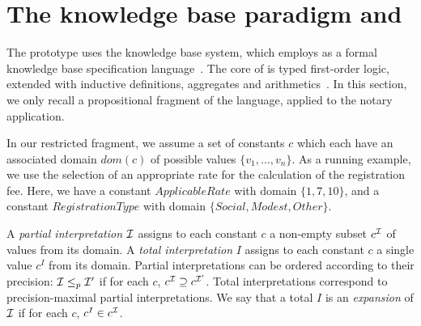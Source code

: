 
\section{The knowledge base paradigm and \idp}
\label{KBP}



The prototype uses the \idp knowledge base system, which employs \fodot as a formal knowledge base specification language~. The core of \fodot is typed first-order logic, extended with inductive definitions, aggregates and arithmetics~. 
In this section, we only recall a propositional fragment of the language, applied to the notary application.

In our restricted fragment, we assume a set of constants $c$ which each have an associated domain $dom(c)$ of possible values $\{v_1,\ldots,v_n\}$. As a running example, we use the selection of an appropriate rate for the calculation of the registration fee. Here, we have a constant $ApplicableRate$ with domain $\{1,7,10\}$, and a constant $RegistrationType$ with domain $\{Social, Modest, Other\}$. 

A \emph{partial interpretation} $\mathcal{I}$ assigns to each constant $c$ a non-empty subset $c^{\mathcal{I}}$ of values from its domain. A \emph{total interpretation} $I$ assigns to each constant $c$ a single value $c^I$ from its domain. Partial interpretations can be ordered according to their precision: $\mathcal{I} \leq_p \mathcal{I}'$ if for each $c$, $c^{\mathcal{I}} \supseteq c^{\mathcal{I}'}$. Total interpretations correspond to precision-maximal partial interpretations.
We say that a total $I$ is an \emph{expansion} of $\mathcal{I}$ if for each $c$, $c^I \in c^{\mathcal{I}}$.
\begin{comment}

As an example, the total interpretation
\[
I_{ex} = \{ ApplicableRate=1, RegistrationType=Social\}
\]
is an expansion of the partial
\begin{align*}
\ci_{ex} = \{ & ApplicableRate\in\{1,7\}, \\
& RegistrationType\in\{Social,Modest,Other\}\}
\end{align*} and also of the least precise partial interpretation $\ci_{ex}^\bot$ that assigns $dom(c)$ to all $c$.
\end{comment}

